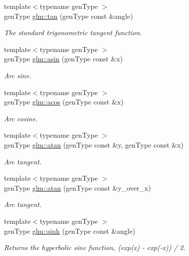 \begin{DoxyCompactItemize}
{\footnotesize template$<$typename gen\-Type $>$ }\\gen\-Type \hyperlink{group__core__func__trigonometric_ga43860bed05c85587e2d931b26d765640}{glm\-::tan} (gen\-Type const \&angle)
\begin{DoxyCompactList}\small\item\em The standard trigonometric tangent function. \end{DoxyCompactList}\item 
{\footnotesize template$<$typename gen\-Type $>$ }\\gen\-Type \hyperlink{group__core__func__trigonometric_ga76b6422e62c99fa0849abdf21fcef5cf}{glm\-::asin} (gen\-Type const \&x)
\begin{DoxyCompactList}\small\item\em Arc sine. \end{DoxyCompactList}\item 
{\footnotesize template$<$typename gen\-Type $>$ }\\gen\-Type \hyperlink{group__core__func__trigonometric_gafef7954b5fa3228f4aaabde8dfa862a1}{glm\-::acos} (gen\-Type const \&x)
\begin{DoxyCompactList}\small\item\em Arc cosine. \end{DoxyCompactList}\item 
{\footnotesize template$<$typename gen\-Type $>$ }\\gen\-Type \hyperlink{group__core__func__trigonometric_ga2394d11075a74869cd88473c76722bc8}{glm\-::atan} (gen\-Type const \&y, gen\-Type const \&x)
\begin{DoxyCompactList}\small\item\em Arc tangent. \end{DoxyCompactList}\item 
{\footnotesize template$<$typename gen\-Type $>$ }\\gen\-Type \hyperlink{group__core__func__trigonometric_ga5db83034488156692939acb4f4e46fa6}{glm\-::atan} (gen\-Type const \&y\-\_\-over\-\_\-x)
\begin{DoxyCompactList}\small\item\em Arc tangent. \end{DoxyCompactList}\item 
{\footnotesize template$<$typename gen\-Type $>$ }\\gen\-Type \hyperlink{group__core__func__trigonometric_ga6f38bb1a343b5d73ac71ddd53baa3375}{glm\-::sinh} (gen\-Type const \&angle)
\begin{DoxyCompactList}\small\item\em Returns the hyperbolic sine function, (exp(x) -\/ exp(-\/x)) / 2. \end{DoxyCompactList}\item 

\end{DoxyCompactItemize}
